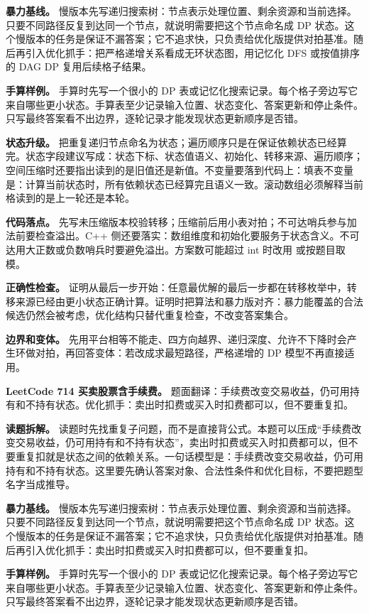 \textbf{暴力基线。} 慢版本先写递归搜索树：节点表示处理位置、剩余资源和当前选择。只要不同路径反复到达同一个节点，就说明需要把这个节点命名成 DP 状态。这个慢版本的任务是保证不漏答案；它不追求快，只负责给优化版提供对拍基准。随后再引入优化抓手：把严格递增关系看成无环状态图，用记忆化 DFS 或按值排序的 DAG DP 复用后续格子结果。

\textbf{手算样例。} 手算时先写一个很小的 DP 表或记忆化搜索记录。每个格子旁边写它来自哪些更小状态。手算表至少记录输入位置、状态变化、答案更新和停止条件。只写最终答案看不出边界，逐轮记录才能发现状态更新顺序是否错。

\textbf{状态升级。} 把重复递归节点命名为状态；遍历顺序只是在保证依赖状态已经算完。状态字段建议写成：状态下标、状态值语义、初始化、转移来源、遍历顺序；空间压缩时还要指出读到的是旧值还是新值。不变量要落到代码上：填表不变量是：计算当前状态时，所有依赖状态已经算完且语义一致。滚动数组必须解释当前格读到的是上一轮还是本轮。

\textbf{代码落点。} 先写未压缩版本校验转移；压缩前后用小表对拍；不可达哨兵参与加法前要检查溢出。C++ 侧还要落实：数组维度和初始化要服务于状态含义。不可达用大正数或负数哨兵时要避免溢出。方案数可能超过 int 时改用  或按题目取模。

\textbf{正确性检查。} 证明从最后一步开始：任意最优解的最后一步都在转移枚举中，转移来源已经由更小状态正确计算。证明时把算法和暴力版对齐：暴力能覆盖的合法候选仍然会被考虑，优化结构只替代重复检查，不改变答案集合。

\textbf{边界和变体。} 先用平台相等不能走、四方向越界、递归深度、允许不下降时会产生环做对拍，再回答变体：若改成求最短路径，严格递增的 DP 模型不再直接适用。

\noindent\textbf{LeetCode 714 买卖股票含手续费。} 题面翻译：手续费改变交易收益，仍可用持有和不持有状态。优化抓手：卖出时扣费或买入时扣费都可以，但不要重复扣。

\textbf{读题拆解。} 读题时先找重复子问题，而不是直接背公式。本题可以压成“手续费改变交易收益，仍可用持有和不持有状态”，卖出时扣费或买入时扣费都可以，但不要重复扣就是状态之间的依赖关系。一句话模型是：手续费改变交易收益，仍可用持有和不持有状态。这里要先确认答案对象、合法性条件和优化目标，不要把题型名字当成推导。

\textbf{暴力基线。} 慢版本先写递归搜索树：节点表示处理位置、剩余资源和当前选择。只要不同路径反复到达同一个节点，就说明需要把这个节点命名成 DP 状态。这个慢版本的任务是保证不漏答案；它不追求快，只负责给优化版提供对拍基准。随后再引入优化抓手：卖出时扣费或买入时扣费都可以，但不要重复扣。

\textbf{手算样例。} 手算时先写一个很小的 DP 表或记忆化搜索记录。每个格子旁边写它来自哪些更小状态。手算表至少记录输入位置、状态变化、答案更新和停止条件。只写最终答案看不出边界，逐轮记录才能发现状态更新顺序是否错。

